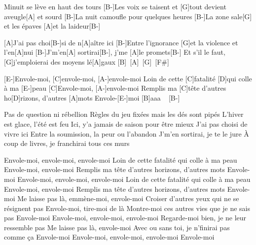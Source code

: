
\begin{guitar}
[B-]Minuit se lève en haut des tours
[B-]Les voix se taisent et [G]tout devient aveugle[A] et sourd
[B-]La nuit camoufle pour quelques heures
[B-]La zone sale[G] et les épaves [A]et la laideur[B-]

[A]J'ai pas choi[B-]si de n[A]aître ici
[B-]Entre l'ignorance [G]et la violence et l'en[A]nui
[B-]J'm'en[A] sortirai[B-], j'me [A]le promets[B-]
Et s'il le faut, [G]j'emploierai des moyens lé[A]gaux [B]~[A]~[G]~[F#]

[E-]Envole-moi, [C]envole-moi, [A-]envole-moi
Loin de cette [C]fatalité [D]qui colle à ma [E-]peau
[C]Envole-moi, [A-]envole-moi
Remplis ma [C]tête d'autres ho[D]rizons, d'autres [A]mots
Envole-[E-]moi  [B]aaa ~ [B-]

Pas de question ni rébellion
Règles du jeu fixées mais les dés sont pipés
L'hiver est glace, l'été est feu
Ici, y'a jamais de saison pour être mieux
J'ai pas choisi de vivre ici
Entre la soumission, la peur ou l'abandon
J'm'en sortirai, je te le jure
À coup de livres, je franchirai tous ces murs

Envole-moi, envole-moi, envole-moi
Loin de cette fatalité qui colle à ma peau
Envole-moi, envole-moi
Remplis ma tête d'autres horizons, d'autres mots
Envole-moi
Envole-moi, envole-moi, envole-moi
Loin de cette fatalité qui colle à ma peau
Envole-moi, envole-moi
Remplis ma tête d'autres horizons, d'autres mots
Envole-moi
Me laisse pas là, emmène-moi, envole-moi
Croiser d'autres yeux qui ne se résignent pas
Envole-moi, tire-moi de là
Montre-moi ces autres vies que je ne sais pas
Envole-moi
Envole-moi, envole-moi, envole-moi
Regarde-moi bien, je ne leur ressemble pas
Me laisse pas là, envole-moi
Avec ou sans toi, je n'finirai pas comme ça
Envole-moi
Envole-moi, envole-moi, envole-moi
Envole-moi
\end{guitar}